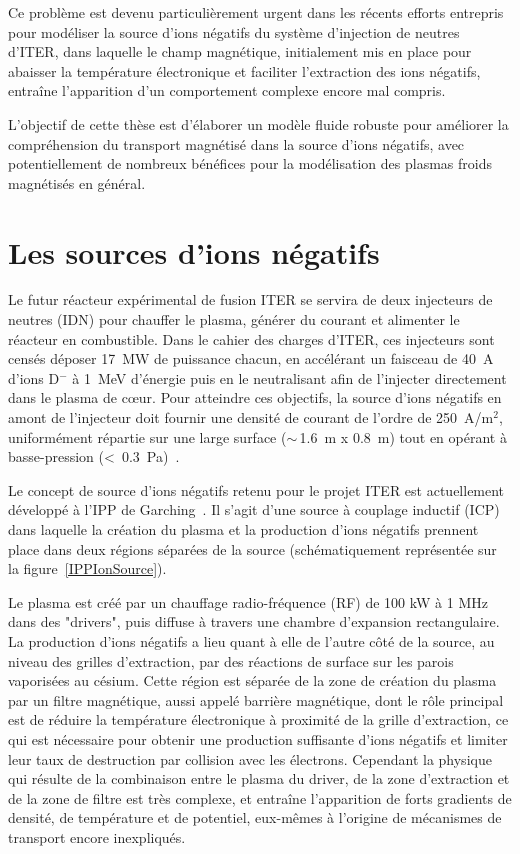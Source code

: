 \begin{refsection}
Ce
problème est devenu particulièrement urgent dans les récents efforts entrepris pour modéliser
la source d'ions négatifs du système d'injection de neutres d'ITER, dans
laquelle le champ magnétique, initialement mis en place pour abaisser la
température électronique et faciliter l'extraction des ions négatifs, entraîne
l'apparition d'un comportement complexe encore mal compris.

L'objectif de cette thèse est d'élaborer un modèle fluide robuste pour 
améliorer la compréhension du transport magnétisé dans 
la source d'ions négatifs, avec potentiellement de nombreux bénéfices pour
la modélisation des plasmas froids magnétisés en général.

\section*{Les sources d'ions négatifs}

Le futur réacteur expérimental de fusion ITER se servira de deux injecteurs de
neutres (IDN) pour chauffer le plasma, générer du courant et alimenter le
réacteur en combustible. Dans le cahier des charges d'ITER, ces injecteurs
sont censés déposer 17~MW de puissance chacun, en accélérant un
faisceau de 40~A d'ions D$^-$ à 1~MeV d'énergie puis en le neutralisant afin de
l'injecter directement dans le plasma de c\oe ur. 
Pour atteindre ces objectifs,
la source d'ions négatifs en amont de l'injecteur doit fournir
une densité de courant de l'ordre de 250~A/m$^2$, uniformément répartie sur une
large surface ($\sim\,$1.6~m x 0.8~m) tout en opérant à
basse-pression (<~0.3~Pa)~\parencite{SimoninHDR}. 

Le concept de source d'ions négatifs retenu pour le projet ITER est
actuellement développé à l'IPP de Garching~\parencite{Hemsworth}. Il s'agit
d'une source à couplage inductif (ICP) dans laquelle la création du plasma et la
production d'ions négatifs prennent place dans deux régions séparées de la
source (schématiquement représentée sur la
figure~\ref{IPPIonSource}).

 Le plasma est créé par un chauffage radio-fréquence
(RF) de 100 kW à 1 MHz dans des "drivers", puis diffuse à travers une chambre
d'expansion rectangulaire. La production d'ions négatifs a lieu quant à elle de
l'autre côté de la source, au niveau des grilles d'extraction, par des
réactions de surface sur les parois vaporisées au césium.
Cette région est séparée de la zone de création du plasma par un filtre
magnétique, aussi appelé barrière magnétique, dont le rôle principal est de
réduire la température électronique à proximité de la grille d'extraction, ce qui est nécessaire pour obtenir une production suffisante
d'ions négatifs et limiter leur taux de destruction par collision avec les
électrons. Cependant la physique qui résulte de la combinaison entre
le plasma du driver, de la zone d'extraction et de la zone de filtre est très
complexe, et entraîne l'apparition de forts gradients de densité,
de température et de potentiel, eux-mêmes à l'origine de mécanismes de transport
encore inexpliqués. 


\end{refsection}
